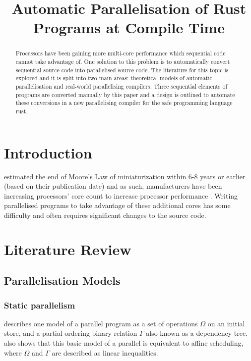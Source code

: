 \documentclass[conference]{IEEEtran}
\begin{document}
\title{Automatic Parallelisation of Rust Programs at Compile Time}

\author{
\and
{}
}

\maketitle

\begin{abstract}
  Processors have been gaining more multi-core performance which sequential code cannot take advantage of. One solution to this problem is to automatically convert sequential source code into parallelised source code. The literature for this topic is explored and it is split into two main areas: theoretical models of automatic parallelisation and real-world parallelising compilers. Three sequential elements of programs are converted manually by this paper and a design is outlined to automate these conversions in a new parallelising compiler for the safe programming language rust. 
\end{abstract}

\section{Introduction}
\textcite{Kish2002} estimated the end of Moore's Law of miniaturization within 6-8 years or earlier (based on their publication date) and as such, manufacturers have been increasing processors' core count to increase processor performance \parencite{Geer2005}. Writing parallelised programs to take advantage of these additional cores has some difficulty and often requires significant changes to the source code.

\section{Literature Review}
\subsection{Parallelisation Models}
\subsubsection{Static parallelism}
\textcite{Feautrier1992} describes one model of a parallel program as a set of operations $\Omega$ on an initial store, and a partial ordering binary relation $\Gamma$ also known as a dependency tree. \textcite{Feautrier1992} also shows that this basic model of a parallel is equivalent to affine scheduling, where $\Omega$ and $\Gamma$ are described as linear inequalities.
\end{document}
